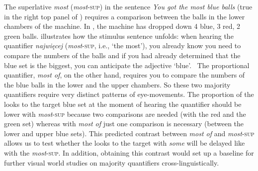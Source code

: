 \documentclass[output=paper]{langscibook}
\begin{document}
The superlative \textit{most} (\textit{most}\textsc{-sup}) in the sentence \textit{You got the most blue balls} (true in the
right top panel of ) requires a comparison between the balls in the lower chambers of the machine. In ,
the machine has dropped down 4 blue, 3 red, 2 green balls.  illustrates how the stimulus sentence unfolds: when
hearing the quantifier \textit{najwięcej} (\textit{most}\textsc{-sup}, i.e., ‘the most’), you already know you need
to compare the numbers of the balls and if you had already determined that the blue set is the biggest, you can
anticipate the adjective ‘blue’. \ The proportional quantifier, \textit{most of}, on the other hand, requires you to
compare the numbers of the blue balls in the lower and the upper chambers. So these two majority quantifiers require
very distinct patterns of eye-movements. The proportion of the looks to the target blue set at the moment of hearing
the quantifier should be lower with \textit{most}\textsc{-sup} because two comparisons are needed (with the
red and the green set) whereas with \textit{most of} just one comparison is necessary (between the lower and upper blue
sets). This predicted contrast between \textit{most of} and \textit{most}\textsc{-sup} allows us to test
whether the looks to the target with \textit{some} will be delayed like with the \textit{most}\textsc{-sup}.
In addition, obtaining this contrast would set up a baseline for further visual world studies on majority quantifiers
cross-linguistically.









\end{document}
